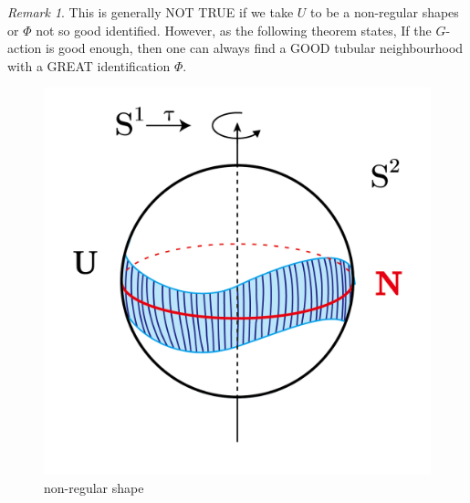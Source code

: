 \documentclass[reqno,11pt]{amsart}
\numberwithin{equation}{section}
\theoremstyle{plain}
\theoremstyle{plain}
\numberwithin{equation}{section}
\theoremstyle{remark}
\newtheorem{remark}[theorem]{Remark}
\begin{document}
\begin{remark}
	This is generally NOT TRUE if we take $U$ to be a non-regular shapes or $\Phi$ not so good identified. However, as the following theorem states, If the $G$-action is good enough, then one can always find a GOOD tubular neighbourhood with a GREAT identification $\Phi$.
\end{remark}
\begin{figure}[th]
	\begin{minipage}[t]{.32\textwidth}
		\centering
		\includegraphics[width=\textwidth]{figures/figure6-01.png}\\
		non-regular shape
		

\end{minipage}
\end{figure}
\end{document}
